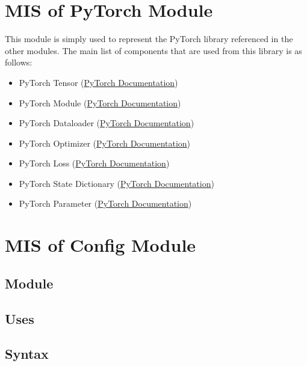 \documentclass[12pt, titlepage]{article}
\begin{document}
\section{MIS of PyTorch Module} \label{ModuleTorch} 
This module is simply used to represent the PyTorch library referenced in the other modules.
The main list of components that are used from this library is as follows:
\begin{itemize}
  \item PyTorch Tensor (\href{https://pytorch.org/docs/stable/tensors.html}{PyTorch Documentation})
  \item PyTorch Module (\href{https://pytorch.org/docs/stable/generated/torch.nn.Module.html}{PyTorch Documentation})
  \item PyTorch Dataloader (\href{https://pytorch.org/tutorials/beginner/basics/data_tutorial.html}{PyTorch Documentation})
  \item PyTorch Optimizer (\href{https://pytorch.org/docs/stable/optim.html}{PyTorch Documentation})
  \item PyTorch Loss (\href{https://pytorch.org/docs/stable/nn.html#loss-functions}{PyTorch Documentation})
  \item PyTorch State Dictionary (\href{https://pytorch.org/tutorials/beginner/saving_loading_models.html}{PyTorch Documentation})
  \item PyTorch Parameter (\href{https://pytorch.org/docs/stable/generated/torch.nn.parameter.Parameter.html}{PyTorch Documentation})
\end{itemize}

\newpage

\section{MIS of Config Module} \label{ModuleCfg} 

\subsection{Module}



\subsection{Uses}


\subsection{Syntax}
\end{document}
